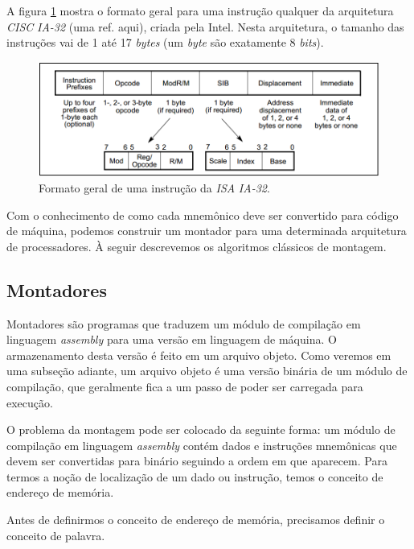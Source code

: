 A figura \ref{instrucoes_ia32} mostra o formato geral para uma instrução
qualquer da arquitetura \textit{CISC} \textit{IA-32} (uma ref. aqui), criada
pela Intel. Nesta arquitetura, o tamanho das instruções vai de 1 até 17
\textit{bytes} (um \textit{byte} são exatamente 8 \textit{bits}).

\begin{figure}[ptb]
  \begin{center}
    \includegraphics[scale=.45]{imagens/instrucoes_ia32}
  \end{center}
  \caption{Formato geral de uma instrução da \textit{ISA} \textit{IA-32}.}
  \label{instrucoes_ia32}
\end{figure}

Com o conhecimento de como cada mnemônico deve ser convertido para código de
máquina, podemos construir um montador para uma determinada arquitetura de
processadores. À seguir descrevemos os algoritmos clássicos de montagem.

\subsection{Montadores}

Montadores são programas que traduzem um módulo de compilação em linguagem
\textit{assembly} para uma versão em linguagem de máquina. O armazenamento desta
versão é feito em um arquivo objeto. Como veremos em uma subseção adiante, um
arquivo objeto é uma versão binária de um módulo de compilação, que geralmente
fica a um passo de poder ser carregada para execução.

O problema da montagem pode ser colocado da seguinte forma: um módulo de
compilação em linguagem \textit{assembly} contém dados e instruções mnemônicas
que devem ser convertidas para binário seguindo a ordem em que aparecem. Para
termos a noção de localização de um dado ou instrução, temos o conceito de
endereço de memória.

Antes de definirmos o conceito de endereço de memória, precisamos definir o
conceito de palavra.

